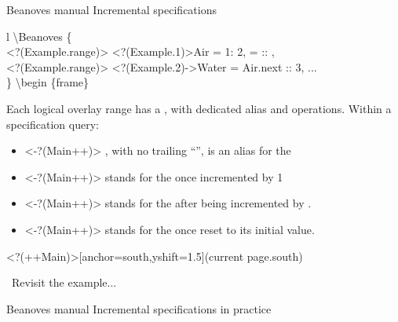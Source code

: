 \documentclass{beamer}
\begin{document}
\begin{frame}
{Beanoves manual}
{\large Incremental specifications}
\begin{myCodeBox}{l}%
\backslash Beanoves \{\\
\phantom{xx}%
\alt<?(Example.range)>{%
  {\only<?(Example.1)>{\color{MyGreen}}Air \phantom{xx}= 1\phantom{xxxxxxxx}: 2,}
}{%
   =  :: ,
}\\
\alt<?(Example.range)>{%
\phantom{xx}%
{\only<?(Example.2)->{\color{MyGreen}}Water = Air.next :: 3,}
}{%
\phantom{xx}...
}\\
\}
\backslash begin \{frame\}\\
\end{myCodeBox}
Each logical overlay range has a , with dedicated alias and operations.
Within a specification query:
\begin{itemize}
\item
\only<-?(Main++)>{}%
, with no trailing ``'', is an alias for the 
\item
\only<-?(Main++)>{}%
 stands for the  once incremented by 1
\item
\only<-?(Main++)>{}%
 stands for the  after being incremented by .
\item
\only<-?(Main++)>{}%
 stands for the  once reset to its initial value.
\end{itemize}
%
\Sticky<?(++Main)>[anchor=south,yshift=1.5\baselineskip](current page.south){\bfseries%
\begin{minipage}{0.5\textwidth}
\myWatch\ Revisit the example...
\end{minipage}
}%
\vspace{2\baselineskip}
%
\end{frame}
\begin{frame}
{Beanoves manual}
{\large Incremental specifications in practice}
\useMyPractice
\end{frame}
\end{document}
